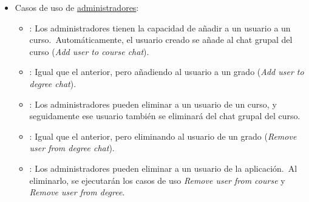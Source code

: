 \begin{itemize}
	\item Casos de uso de \underline{administradores}:
	\begin{itemize}
		\item {}:
		Los administradores tienen la capacidad de añadir a un usuario a un curso.\ Automáticamente, el usuario creado
		se añade al chat grupal del curso (\textit{Add user to course chat}).
		\item {}:
		Igual que el anterior, pero añadiendo al usuario a un grado (\textit{Add user to degree chat}).
		\item {}:
		Los administradores pueden eliminar a un usuario de un curso, y seguidamente ese usuario también se eliminará
		del chat grupal del curso.
		\item {}:
		Igual que el anterior, pero eliminando al usuario de un grado (\textit{Remove user from degree chat}).
		\item {}:
		Los administradores pueden eliminar a un usuario de la aplicación.\ Al eliminarlo, se ejecutarán los casos de
		uso \textit{Remove user from course} y \textit{Remove user from degree}.
	\end{itemize}
\end{itemize}
